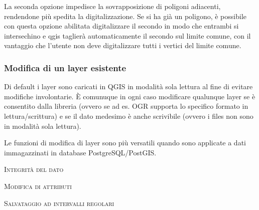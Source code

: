 
La seconda opzione 
impedisce la sovrapposizione di poligoni adiacenti, rendendone più spedita la
digitalizzazione. Se si ha già un poligono, è possibile con questa opzione
abilitata digitalizzare il secondo in modo che entrambi si intersechino e qgis
taglierà automaticamente il secondo sul limite comune, con il vantaggio che
l'utente non deve digitalizzare tutti i vertici del limite comune.

\subsubsection{Modifica di un layer esistente}
\label{sec:edit_existing_layer}

Di default i layer sono caricati in QGIS in modalità sola lettura al fine di
evitare modifiche involontarie.
È comunuque in ogni caso modificare qualunque layer se è consentito dalla
libreria (ovvero se ad es. OGR supporta lo specifico formato in
lettura/scrittura) e se il dato medesimo è anche scrivibile (ovvero i files
non sono in modalità sola lettura).

Le funzioni di modifica di layer sono più versatili quando sono applicate a
dati immagazzinati in database PostgreSQL/PostGIS. 

\begin{Tip}[ht]\caption{\textsc{Integrità del dato}}
\end{Tip}

\begin{Tip}[ht]\caption{\textsc{Modifica di attributi}}
\end{Tip}



\begin{Tip}[ht]\caption{\textsc{Salvataggio ad intervalli regolari}}
\end{Tip}

